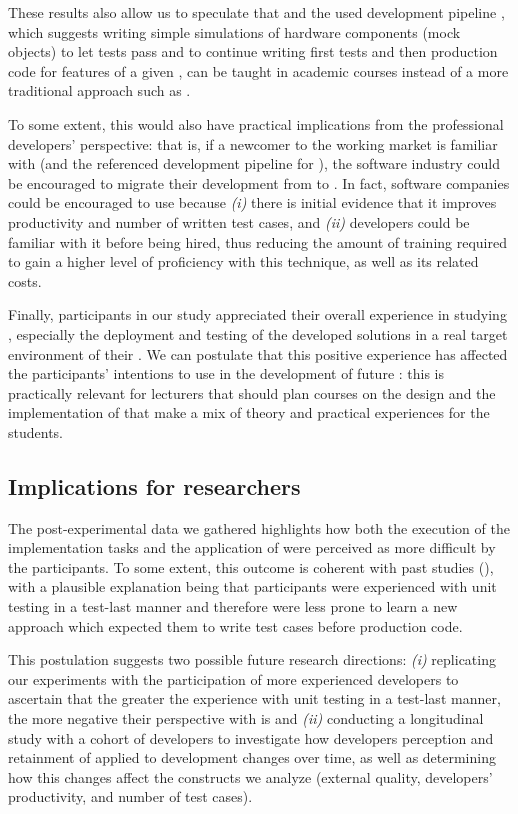 These results also allow us to speculate that \tdd and the used development pipeline \cite{TDDEC}, which suggests writing simple simulations of hardware components (\ie mock objects) to let tests pass and to continue writing first tests and then production code for features of a given \es, can be taught in academic \ess courses instead of a more traditional approach such as \notdd.

To some extent, this would also have practical implications from the professional developers' perspective: that is, if a newcomer to the working market is familiar with \tdd (and the referenced development pipeline for \ess), the software industry could be encouraged to migrate their development from \notdd to \tdd. In fact, software companies could be encouraged to use \tdd because \textit{(i)} there is initial evidence that it improves productivity and number of written test cases, and \textit{(ii)} developers could be familiar with it before being hired, thus reducing the amount of training required to gain a higher level of proficiency with this technique, as well as its related costs.

Finally, participants in our study appreciated their overall experience in studying \tdd, especially the deployment and testing of the developed solutions in a real target environment of their \es. 
We can postulate that this positive experience has affected the participants' intentions to use \tdd in the development of future \ess: this is practically relevant for lecturers that should plan courses on the design and the implementation of \ess that make a mix of theory and practical experiences for the students.

\subsection{Implications for researchers} 
The post-experimental data we gathered highlights how both the execution of the implementation tasks and the application of \tdd were perceived as more difficult by the participants. 
To some extent, this outcome is coherent with past studies (\eg \cite{DBLP:conf/xpu/0001SBFC20, DBLP:conf/esem/RomanoZBPS22}), with a plausible explanation being that participants were experienced with unit testing in a test-last manner and therefore were less prone to learn a new approach which expected them to write test cases before production code. 

This postulation suggests two possible future research directions: \textit{(i)} replicating our experiments with the participation of more experienced developers to ascertain that the greater the experience with unit testing in a test-last manner, the more negative their perspective with \tdd is and \textit{(ii)} conducting a longitudinal study with a cohort of developers to investigate how developers perception and retainment of \tdd applied to \es development changes over time, as well as determining how this changes affect the constructs we analyze (\ie external quality, developers' productivity, and number of test cases).


